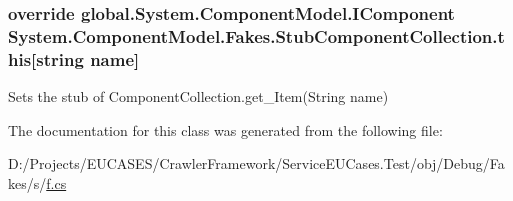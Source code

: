 \hypertarget{class_system_1_1_component_model_1_1_fakes_1_1_stub_component_collection_a17745f6b4dee4d44b385b8248e1fb271}{
\subsubsection[{this[string name]}]{\setlength{\rightskip}{0pt plus 5cm}override global.\-System.\-Component\-Model.\-I\-Component System.\-Component\-Model.\-Fakes.\-Stub\-Component\-Collection.\-this\mbox{[}string name\mbox{]}\hspace{0.3cm}{\ttfamily [get]}}}\label{class_system_1_1_component_model_1_1_fakes_1_1_stub_component_collection_a17745f6b4dee4d44b385b8248e1fb271}


Sets the stub of Component\-Collection.\-get\-\_\-\-Item(\-String name)



The documentation for this class was generated from the following file\-:\begin{DoxyCompactItemize}
\item 
D\-:/\-Projects/\-E\-U\-C\-A\-S\-E\-S/\-Crawler\-Framework/\-Service\-E\-U\-Cases.\-Test/obj/\-Debug/\-Fakes/s/\hyperlink{s_2f_8cs}{f.\-cs}\end{DoxyCompactItemize}
